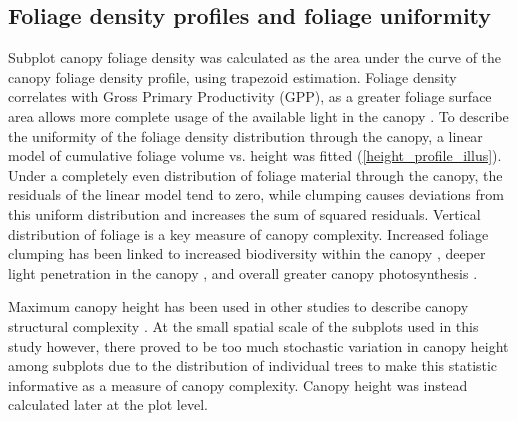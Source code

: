\documentclass[11pt,a4paper]{article}
\begin{document}
\subsection{Foliage density profiles and foliage uniformity}

Subplot canopy foliage density was calculated as the area under the curve of the canopy foliage density profile, using trapezoid estimation. Foliage density correlates with Gross Primary Productivity (GPP), as a greater foliage surface area allows more complete usage of the available light in the canopy \citep{Kotchenova2004}. To describe the uniformity of the foliage density distribution through the canopy, a linear model of cumulative foliage volume vs. height was fitted (\autoref{height_profile_illus}). Under a completely even distribution of foliage material through the canopy, the residuals of the linear model tend to zero, while clumping causes deviations from this uniform distribution and increases the sum of squared residuals. Vertical distribution of foliage is a key measure of canopy complexity. Increased foliage clumping has been linked to increased biodiversity within the canopy \citep{Ishii2004}, deeper light penetration in the canopy \citep{Beland2021a}, and overall greater canopy photosynthesis \citep{Baldocchi1986, Beland2021a}.

Maximum canopy height has been used in other studies to describe canopy structural complexity \citep{Scheuermann2018}. At the small spatial scale of the subplots used in this study however, there proved to be too much stochastic variation in canopy height among subplots due to the distribution of individual trees to make this statistic informative as a measure of canopy complexity. Canopy height was instead calculated later at the plot level. 
\end{document}
